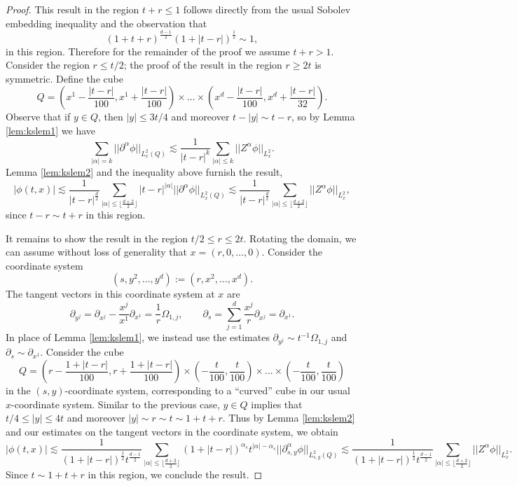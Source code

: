 \begin{proof}
	This result in the region $t + r \leq 1$ follows directly from the usual Sobolev embedding inequality and the observation that
		\[ (1 + t  +r)^{\frac{d - 1}{2}} (1 + |t - r|)^\frac12 \sim 1, \]
	in this region. Therefore for the remainder of the proof we assume $t + r > 1$. Consider the region $r \leq t/2$; the proof of the result in the region $r \geq 2t$ is symmetric. Define the cube	
		\[ Q =  \left(x^1 - \frac{|t - r|}{100}, x^1 + \frac{|
t - r|}{100}\right) \times \dots \times  \left(x^d - \frac{|t - r|}{100}, x^d + \frac{|
t - r|}{32}\right). \]
	Observe that if $y \in Q$, then $|y| \leq 3t/4$ and moreover $t - |y| \sim t - r$, so by Lemma \ref{lem:kslem1} we have
		\[ \sum_{|\alpha| = k}||\partial^\alpha \phi ||_{L^2_x (Q)} \lesssim \frac{1}{|t - r|^k} \sum_{|\alpha| \leq k} ||Z^\alpha \phi ||_{L^2_x}. \]
	Lemma \ref{lem:kslem2} and the inequality above furnish the result, 
		\[ |\phi (t, x)| \lesssim \frac{1}{|t - r|^{\frac{d}{2}}} \sum_{|\alpha| \leq \lfloor \frac{d + 2}{2} \rfloor} |t - r|^{|\alpha|} ||\partial^\alpha \phi||_{L^2_x (Q)} \lesssim  \frac{1}{|t - r|^{\frac{d}{2}}} \sum_{|\alpha| \leq \lfloor \frac{d + 2}{2} \rfloor} ||Z^\alpha \phi||_{L^2_x}, \]
	since $t - r \sim t + r$ in this region. 		
	
	It remains to show the result in the region $t/2 \leq r \leq 2t$. Rotating the domain, we can assume without loss of generality that $x = (r, 0, \dots, 0)$. Consider the coordinate system 
		\[ (s, y^2, \dots, y^d) := (r, x^2, \dots, x^d). \]
	The tangent vectors in this coordinate system at $x$ are
		\[ \partial_{y^j} = \partial_{x^j} - \frac{x^j}{x^1} \partial_{x^1} = \frac{1}{r} \Omega_{1, j}, \qquad \partial_s = \sum_{j = 1}^d \frac{x^j}{r} \partial_{x^j} = \partial_{x^1}. \]
	In place of Lemma \ref{lem:kslem1}, we instead use the estimates $\partial_{y^j} \sim t^{-1} \Omega_{1, j}$ and $ \partial_s \sim \partial_{x^1}$. Consider the cube
		\[ Q = \left( r - \frac{1 + |t - r|}{100}, r + \frac{1 + |t - r|}{100} \right) \times \left(-\frac{t}{100}, \frac{t}{100} \right) \times \dots \times \left( -\frac{t}{100}, \frac{t}{100} \right) \]	
	in the $(s, y)$-coordinate system, corresponding to a ``curved'' cube in our usual $x$-coordinate system. Similar to the previous case, $y \in Q$ implies that $t/4 \leq |y| \leq 4t$ and moreover $|y| \sim r \sim t \sim 1 + t + r$. Thus by Lemma \ref{lem:kslem2} and our estimates on the tangent vectors in the coordinate system, we obtain
		\[ |\phi(t, x)| \lesssim \frac{1}{(1 + |t - r|)^\frac12 t^{\frac{d - 1}{2}}} \sum_{|\alpha| \leq \lfloor\frac{d + 2}{2}\rfloor} (1 + |t - r|)^{\alpha_s} t^{|\alpha| - \alpha_s} ||\partial_{s, y}^\alpha \phi ||_{L^2_{s, y} (Q)} \lesssim \frac{1}{(1 + |t - r|)^\frac12 t^{\frac{d - 1}{2}}} \sum_{|\alpha| \leq \lfloor\frac{d + 2}{2}\rfloor} ||Z^\alpha \phi||_{L^2_x}. \]
	Since $t \sim 1 + t + r$ in this region, we conclude the result.  	
\end{proof}

